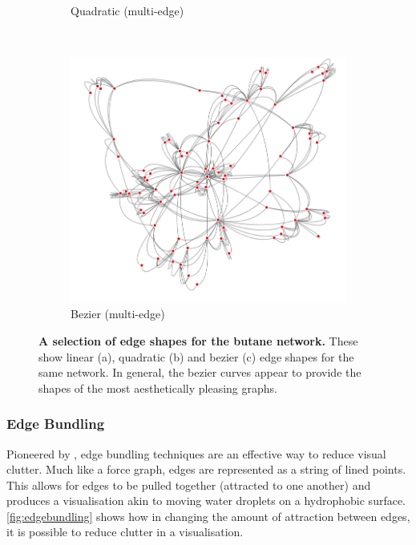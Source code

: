 \begin{figure}[H]
\begin{subfigure}[b]{.292\textheight}
     \caption{Quadratic (multi-edge)}
     \end{subfigure}\\
     \begin{subfigure}[b]{.292\textheight}
         \centering
     \includegraphics[width=\textwidth]{figures_c1/edgetype/multibeziergray.png}
     \caption{Bezier (multi-edge)}
     \end{subfigure}
        \caption{\textbf{A selection of edge shapes for the butane network.} These show linear (a), quadratic (b) and bezier (c) edge shapes for the same network. In general, the bezier curves appear to provide the shapes of the most aesthetically pleasing graphs.       }
      \label{fig:curvededge}
\end{figure}








\subsubsection{Edge Bundling }
Pioneered by \cite{edgebundle}, edge bundling techniques are an effective way to reduce visual clutter. Much like a force graph, edges are represented as a string of lined points. This allows for edges to be pulled together (attracted to one another) and produces a visualisation akin to moving water droplets on a hydrophobic surface. \autoref{fig:edgebundling} shows how in changing the amount of attraction between edges, it is possible to reduce clutter in a visualisation.


